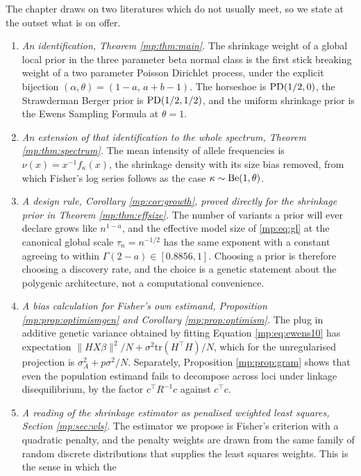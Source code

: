 The chapter draws on two literatures which do not usually meet, so we state at the outset what
is on offer.

\begin{enumerate}[leftmargin=1.8em,itemsep=3pt]
\item \emph{An identification, Theorem \ref{mp:thm:main}.} The shrinkage weight of a
global local prior in the three parameter beta normal class is the first stick breaking
weight of a two parameter Poisson Dirichlet process, under the explicit bijection
$(\alpha,\theta)=(1-a,\,a+b-1)$. The horseshoe is $\mathrm{PD}(1/2,0)$, the Strawderman Berger
prior is $\mathrm{PD}(1/2,1/2)$, and the uniform shrinkage prior is the Ewens Sampling Formula at
$\theta=1$.
\item \emph{An extension of that identification to the whole spectrum, Theorem
\ref{mp:thm:spectrum}.} The mean intensity of allele frequencies is $\nu(x)=x^{-1}f_\kappa(x)$,
the shrinkage density with its size bias removed, from which Fisher's log series follows as the case
$\kappa\sim\mathrm{Be}(1,\theta)$.
\item \emph{A design rule, Corollary \ref{mp:cor:growth}, proved directly for the shrinkage
prior in Theorem \ref{mp:thm:effsize}.} The number of variants a prior will ever declare grows
like $n^{1-a}$, and the effective model size of \eqref{mp:eq:gl} at the canonical global scale
$\tau_n=n^{-1/2}$ has the same exponent with a constant agreeing to within
$\Gamma(2-a)\in[0.8856,1]$. Choosing a prior is therefore choosing a discovery rate,
and the choice is a genetic statement about the polygenic architecture, not a computational
convenience.
\item \emph{A bias calculation for Fisher's own estimand, Proposition
\ref{mp:prop:optimismgen} and Corollary \ref{mp:prop:optimism}.} The plug in additive genetic
variance obtained by fitting Equation \eqref{mp:eq:ewens10} has expectation
$\|HX\beta\|^2/N+\sigma^2\mathrm{tr}(H^\top H)/N$, which for the unregularised projection is
$\sigma_A^2+p\sigma^2/N$. Separately, Proposition \ref{mp:prop:gram} shows that even the
population estimand fails to decompose across loci under linkage disequilibrium, by the
factor $c^\top R^{-1}c$ against $c^\top c$.
\item \emph{A reading of the shrinkage estimator as penalised weighted least squares,
Section \ref{mp:sec:wls}.} The estimator we propose is Fisher's criterion with a quadratic
penalty, and the penalty weights are drawn from the same family of random discrete
distributions that supplies the least squares weights. This is the sense in which the

\end{enumerate}
